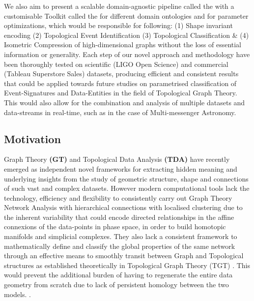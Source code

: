 We also aim to present a scalable domain-agnostic pipeline called the \textbf{} with a customisable Toolkit called the \textbf{} for different domain ontologies and for parameter optimizations, which would be responsible for following: (1) Shape invariant encoding (2) Topological Event Identification (3) Topological Classification \& (4) Isometric  Compression of high-dimensional graphs without the loss of essential information or generality.  Each step of our novel approach and methodology have been thoroughly tested on scientific (LIGO Open Science) \cite{01.5_LIGOOpenSci} \cite{00_LIGOOpenSciData} and commercial (Tableau Superstore Sales) datasets, producing efficient and consistent results that could be applied towards future studies on parametrised classification of Event-Signatures and Data-Entities in the field of Topological Graph Theory.\cite{17.1_2012foundationsTGT} This would also allow for the combination and analysis of multiple datasets and data-streams in real-time, such as in the case of Multi-messenger Astronomy.

\subsection{Motivation}

Graph Theory \textbf{(GT)} \cite{01.6_GTIntro} \cite{01.7_GTApplications} \cite{01.8_ModernGT} and Topological Data Analysis \textbf{(TDA) } \cite{01.3_2016TDANewOpportunities} \cite{01_GCarlssonEpstein2011} have recently emerged as independent novel frameworks for extracting hidden meaning and underlying insights from the study of geometric structure, shape and connections of such vast and complex datasets. \cite{02.3_2017introductionTDA} \cite{02.4_TDAResearch} However modern computational tools lack the technology, efficiency and flexibility to consistently carry out Graph Theory Network Analysis with hierarchical connections with localised clustering due to the inherent variability that could encode directed relationships in the affine connexions \cite{23.2_AffineConnection} \cite{23.1_7FundamentalQuants}
of the data-points in phase space, in order to build homotopic manifolds and simplicial complexes\cite{02.6_2009TDAChallenges}.\cite{01.9_2007MapperPBG} \cite{03.1_2009simplicialHomotopy}\cite{01_GCarlssonEpstein2011}  They also lack a consistent framework to mathematically define and classify the global properties of the same network through an effective means to smoothly transit between Graph and Topological structures as established theoretically in Topological Graph Theory (TGT)\cite{17.3_1996topologicalGT} \cite{17.4_TGTRecentResults}. This would prevent the additional burden of having to regenerate the entire data geometry from scratch due to lack of persistent homology between the two models.\cite{02_carlsson2009topology} \cite{03.3_de2007PersistentHomology} \cite{01_GCarlssonEpstein2011}.

